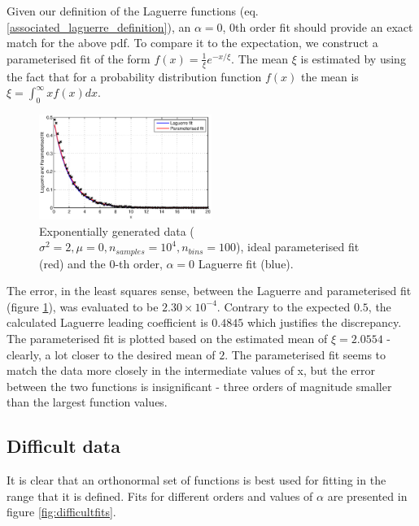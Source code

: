 \documentclass[a4paper]{article}
\numberwithin{equation}{section}
\begin{document}
\noindent Given our definition of the Laguerre functions (eq. \ref{associated_laguerre_definition}), an $\alpha = 0$, 0th order fit should provide an exact match for the above pdf. To compare it to the expectation, we construct a parameterised fit of the form $f(x) = \frac{1}{\xi} e^{-x/\xi}$. The mean $\xi$ is estimated by using the fact that for a probability distribution function $f(x)$ the mean is $\xi = \int_{0}^{\infty} xf(x) dx$. \\

\begin{figure}[!h]
\centering
\includegraphics[width=0.5\textwidth]{laguerre_parameterised_fit.eps}
\caption{\label{fig:laguerreparemeterisedfit}Exponentially generated data ($\sigma^2=2, \mu=0, n_{samples}=10^4, n_{bins}=100$), ideal parameterised fit (red) and the 0-th order, $\alpha=0$ Laguerre fit (blue).}
\end{figure}

\noindent The error, in the least squares sense, between the Laguerre and parameterised fit (figure \ref{fig:laguerreparemeterisedfit}), was evaluated to be $2.30 \times 10^{-4}$. Contrary to the expected $0.5$, the calculated Laguerre leading coefficient is $0.4845$ which justifies the discrepancy. The parameterised fit is plotted based on the estimated mean of $\xi=2.0554$ - clearly, a lot closer to the desired mean of $2$. The parameterised fit seems to match the data more closely in the intermediate values of x, but the error between the two functions is insignificant - three orders of magnitude smaller than the largest function values.  

\subsection{Difficult data}
It is clear that an orthonormal set of functions is best used for fitting in the range that it is defined. Fits for different orders and values of $\alpha$ are presented in figure \ref{fig:difficultfits}.
\end{document}

